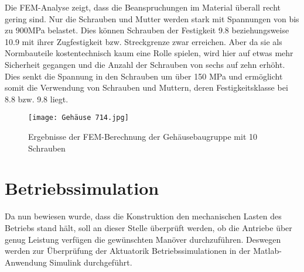 Die FEM-Analyse zeigt, dass die Beanspruchungen im Material überall recht gering sind. Nur die Schrauben und Mutter werden stark mit Spannungen von bis zu $900$MPa belastet. Dies können Schrauben der Festigkeit 9.8 beziehungsweise 10.9 mit ihrer Zugfestigkeit bzw. Streckgrenze zwar erreichen. Aber da sie als Normbauteile kostentechnisch kaum eine Rolle spielen, wird hier auf etwas mehr Sicherheit gegangen und die Anzahl der Schrauben von sechs auf zehn erhöht. Dies senkt die Spannung in den Schrauben um über 150 MPa und ermöglicht somit die Verwendung von Schrauben und Muttern, deren Festigkeitsklasse bei 8.8 bzw. 9.8 liegt.
\begin{figure}[h] 
	\centering
	\texttt{[image: Gehäuse 714.jpg]}
	\caption{Ergebnisse der FEM-Berechnung der Gehäusebaugruppe mit 10 Schrauben}
\end{figure}
\section{Betriebssimulation}\label{sec:betriebssim}
Da nun bewiesen wurde, dass die Konstruktion den mechanischen Lasten des Betriebs stand hält, soll an dieser Stelle überprüft werden, ob die Antriebe über genug Leistung verfügen die gewünschten Manöver durchzuführen. Deswegen werden zur Überprüfung der Aktuatorik Betriebssimulationen in der Matlab-Anwendung Simulink durchgeführt.
